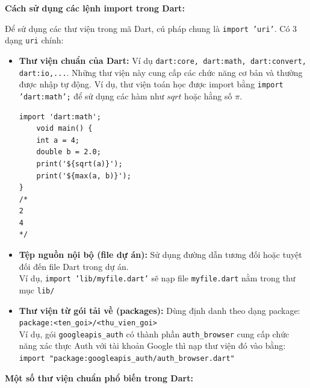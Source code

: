 \documentclass[../DoAn.tex]{subfiles}
\numberwithin{figure}{chapter}
\begin{document}
\textbf{Cách sử dụng các lệnh import trong Dart:} 

Để sử dụng các thư viện trong mã Dart, cú pháp chung là \texttt{import 'uri'}. Có 3 dạng \texttt{uri} chính:
\begin{itemize}
\item \textbf{Thư viện chuẩn của Dart: } Ví dụ \texttt{dart:core, dart:math, dart:convert, dart:io,...}. Những thư viện này cung cấp các chức năng cơ bản và thường được nhập tự động. 
Ví dụ, thư viện toán học được import bằng \texttt{import 'dart:math';} để sử dụng các hàm như $sqrt$ hoặc hằng số $\pi$.
\begin{lstlisting}
import 'dart:math';
    void main() {
    int a = 4;
    double b = 2.0;
    print('${sqrt(a)}'); 
    print('${max(a, b)}');
}
/*
2
4
*/
\end{lstlisting}
    \item \textbf{Tệp nguồn nội bộ (file dự án):} Sử dụng đường dẫn tương đối hoặc tuyệt đối đến file Dart trong dự án. \\
    Ví dụ, \texttt{import 'lib/myfile.dart'} sẽ nạp file \texttt{myfile.dart} nằm trong thư mục \texttt{lib/}
    \item \textbf{Thư viện từ gói tải về (packages):} Dùng định danh theo dạng package: \texttt{package:<ten\_goi>/<thu\_vien\_goi>} \\
    Ví dụ, gói \texttt{googleapis\_auth} có thành phần \texttt{auth\_browser} cung cấp chức năng xác thực Auth với tài khoản Google thì nạp thư viện đó vào bằng: \\
    \texttt{import "package:googleapis\_auth/auth\_browser.dart"}
\end{itemize}

\textbf{Một số thư viện chuẩn phổ biến trong Dart:} 
\end{document}
